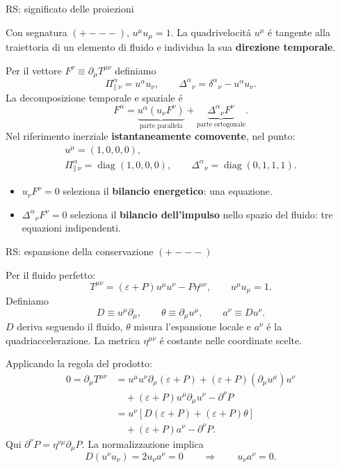 \begin{frame}[t]{RS: significato delle proiezioni}
\small\raggedright
\setlength{\abovedisplayskip}{3pt plus 1pt minus 1pt}
\setlength{\belowdisplayskip}{3pt plus 1pt minus 1pt}
\setlength{\abovedisplayshortskip}{0pt plus 1pt}
\setlength{\belowdisplayshortskip}{2pt plus 1pt minus 1pt}
Con segnatura $(+---)$, $u^\mu u_\mu=1$.
La quadrivelocit\'a $u^\mu$ \'e tangente alla traiettoria di un elemento
di fluido e individua la sua \textbf{direzione temporale}.

\medskip
Per il vettore $F^\nu\equiv\partial_\mu T^{\mu\nu}$ definiamo
\[
\Pi_\parallel^\alpha{}_\nu=u^\alpha u_\nu,\qquad
\Delta^\alpha{}_\nu=\delta^\alpha{}_\nu-u^\alpha u_\nu.
\]
La decomposizione temporale e spaziale \'e
\[
F^\alpha
=\underbrace{u^\alpha(u_\nu F^\nu)}_{\text{parte parallela}}
+\underbrace{\Delta^\alpha{}_\nu F^\nu}_{\text{parte ortogonale}}.
\]
Nel riferimento inerziale \textbf{istantaneamente comovente}, nel punto:
\[
\begin{gathered}
u^\mu=(1,0,0,0),\\
\Pi_\parallel^\alpha{}_\nu=\operatorname{diag}(1,0,0,0),\qquad
\Delta^\alpha{}_\nu=\operatorname{diag}(0,1,1,1).
\end{gathered}
\]
\begin{itemize}
\item $u_\nu F^\nu=0$ seleziona il \textbf{bilancio energetico}: una equazione.
\item $\Delta^\alpha{}_\nu F^\nu=0$ seleziona il \textbf{bilancio dell'impulso}
nello spazio del fluido: tre equazioni indipendenti.
\end{itemize}
\end{frame}

\begin{frame}[t]{RS: espansione della conservazione $(+---)$}
\small\raggedright
\setlength{\abovedisplayskip}{3pt plus 1pt minus 1pt}
\setlength{\belowdisplayskip}{3pt plus 1pt minus 1pt}
\setlength{\abovedisplayshortskip}{0pt plus 1pt}
\setlength{\belowdisplayshortskip}{2pt plus 1pt minus 1pt}
Per il fluido perfetto:
\[
T^{\mu\nu}=(\varepsilon+P)u^\mu u^\nu-P\eta^{\mu\nu},
\qquad u^\mu u_\mu=1.
\]
Definiamo
\[
D\equiv u^\mu\partial_\mu,\qquad
\theta\equiv\partial_\mu u^\mu,\qquad
a^\nu\equiv Du^\nu.
\]
$D$ deriva seguendo il fluido, $\theta$ misura l'espansione locale
e $a^\nu$ \'e la quadriaccelerazione.
La metrica $\eta^{\mu\nu}$ \'e costante nelle coordinate scelte.

\medskip
Applicando la regola del prodotto:
\[
\begin{aligned}
0=\partial_\mu T^{\mu\nu}
&=u^\mu u^\nu\partial_\mu(\varepsilon+P)
 +(\varepsilon+P)(\partial_\mu u^\mu)u^\nu\\
&\quad+(\varepsilon+P)u^\mu\partial_\mu u^\nu
 -\partial^\nu P\\
&=u^\nu\!\left[D(\varepsilon+P)+(\varepsilon+P)\theta\right]\\
&\quad+(\varepsilon+P)a^\nu-\partial^\nu P.
\end{aligned}
\]
Qui $\partial^\nu P=\eta^{\nu\mu}\partial_\mu P$.
La normalizzazione implica
\[
D(u^\nu u_\nu)=2u_\nu a^\nu=0
\qquad\Longrightarrow\qquad
\boxed{u_\nu a^\nu=0}.
\]
\end{frame}


